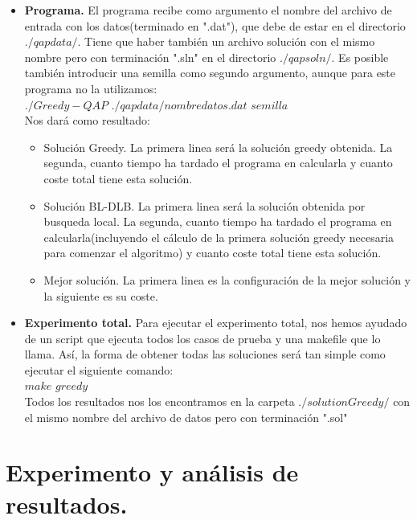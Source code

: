 \begin{itemize}
	\item \textbf{Programa.} El programa recibe como argumento el nombre del archivo de entrada con los datos(terminado en ".dat"), que debe de estar en el directorio $./qapdata/$. Tiene que haber también un archivo solución con el mismo nombre pero con terminación ".sln" en el directorio $./qapsoln/$. Es posible también introducir una semilla como segundo argumento, aunque para este programa no la utilizamos:\\
	
	$./Greedy-QAP$ $./qapdata/nombredatos.dat$ $semilla$\\
	
	Nos dará como resultado:\\
	\begin{itemize}
		\item Solución Greedy. La primera linea será la solución greedy obtenida. La segunda, cuanto tiempo ha tardado el programa en calcularla y cuanto coste total tiene esta solución.
		\item Solución BL-DLB. La primera linea será la solución obtenida por busqueda local. La segunda, cuanto tiempo ha tardado el programa en calcularla(incluyendo el cálculo de la primera solución greedy necesaria para comenzar el algoritmo) y cuanto coste total tiene esta solución.
		\item Mejor solución. La primera linea es la configuración de la mejor solución y la siguiente es su coste.
	\end{itemize}
	
	\item \textbf{Experimento total.} Para ejecutar el experimento total, nos hemos ayudado de un script que ejecuta todos los casos de prueba y una makefile que lo llama. Así, la forma de obtener todas las soluciones será tan simple como ejecutar el siguiente comando:\\
	
	$make$ $greedy$\\
	
	Todos los resultados nos los encontramos en la carpeta $./solutionGreedy/$ con el mismo nombre del archivo de datos pero con terminación ".sol"
\end{itemize}

\newpage
\section{Experimento y análisis de resultados.}










